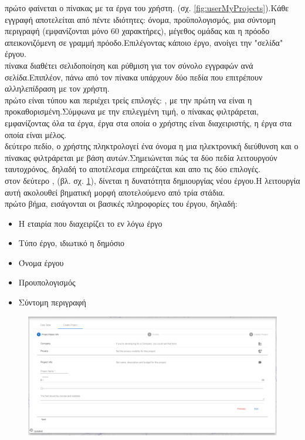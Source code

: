  πρώτο  φαίνεται ο πίνακας με τα έργα του χρήστη. (σχ. \ref{fig:userMyProjects}).Κάθε εγγραφή αποτελείται από πέντε ιδιότητες: όνομα, προϋπολογισμός, μια σύντομη περιγραφή (εμφανίζονται μόνο 60 χαρακτήρες), μέγεθος ομάδας και η πρόοδο απεικονιζόμενη σε γραμμή πρόοδο.Επιλέγοντας κάποιο έργο, ανοίγει την "σελίδα" έργου.\\
 πίνακα διαθέτει σελιδοποίηση και ρύθμιση για τον σύνολο εγγραφών ανά σελίδα.Επιπλέον, πάνω από τον πίνακα υπάρχουν δύο πεδία που επιτρέπουν αλληλεπίδραση με τον χρήστη.\\
 πρώτο είναι τύπου  και περιέχει τρείς επιλογές: , με την πρώτη να είναι η προκαθορισμένη.Σύμφωνα με την επιλεγμένη τιμή, ο πίνακας φιλτράρεται, εμφανίζοντας όλα τα έργα, έργα στα οποία ο χρήστης είναι διαχειριστής, η έργα στα οποία είναι μέλος.\\
 δεύτερο πεδίο, ο χρήστης πληκτρολογεί ένα όνομα η μια ηλεκτρονική διεύθυνση και ο πίνακας φιλτράρεται με βάση αυτών.Σημειώνεται πώς τα δύο πεδία λειτουργούν ταυτοχρόνος, δηλαδή το αποτέλεσμα επηρεάζεται και απο τις δύο επιλογές.\\

 στον δεύτερο ,  (βλ. σχ. \ref{fig:userCreateProject1}), δίνεται η δυνατότητα δημιουργίας νέου έργου.Η λειτουργία αυτή ακολουθεί βηματική μορφή αποτελούμενο από τρία στάδια.\\
 πρώτο βήμα, εισάγονται οι βασικές πληροφορίες του έργου, δηλαδή:\\
\begin{itemize}
	\item Η εταιρία που διαχειρίζει το εν λόγω έργο
	\item Τύπο έργο, ιδιωτικό η δημόσιο
	\item Όνομα έργου
	\item Προυπολογισμός
	\item Σύντομη περιγραφή
\end{itemize}

\begin{figure}[!htb]
\includegraphics[width=\columnwidth, scale=4]{images/userCreateProject1.png}
\caption{}
\label{fig:userCreateProject1}
\end{figure}

